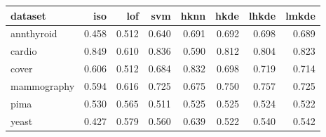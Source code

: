 \begin{tabular}{l|rrr|rrrr}
  \toprule
dataset & iso & lof & svm & hknn & hkde & lhkde & lmkde \\ 
  \midrule
annthyroid & 0.458 & 0.512 & 0.640 & 0.691 & 0.692 & $\bm{0.698}$ & 0.689 \\ 
  cardio & $\bm{0.849}$ & 0.610 & 0.836 & 0.590 & 0.812 & 0.804 & 0.823 \\ 
  cover & 0.606 & 0.512 & 0.684 & $\bm{0.832}$ & 0.698 & 0.719 & 0.714 \\ 
  mammography & 0.594 & 0.616 & 0.725 & 0.675 & $0.750$ & $\bm{0.757}$ & 0.725 \\ 
  pima & 0.530 & $\bm{0.565}$ & 0.511 & 0.525 & 0.525 & 0.524 & 0.522 \\ 
  yeast & 0.427 & 0.579 & 0.560 & $\bm{0.639}$ & 0.522 & 0.540 & 0.542 \\ 
   \bottomrule
\end{tabular}
